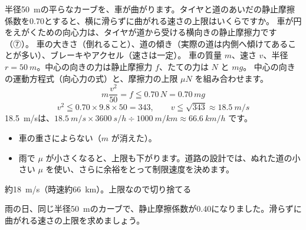\begin{phreidai}[カーブを曲がれる速さ]
\label{ph:力-2:ex8}半径\qty{50}{m}の平らなカーブを、車が曲がります。タイヤと道のあいだの静止摩擦係数を0.70とすると、横に滑らずに曲がれる速さの上限はいくらですか。
\phbamen
車が円をえがくための向心力は、タイヤが道から受ける横向きの静止摩擦力です（⑦）。
\phmushi
車の大きさ（倒れること）、道の傾き（実際の道は内側へ傾けてあることが多い）、ブレーキやアクセル（速さは一定）。
\phzu
車の質量 $m$、速さ $v$、半径 $r=\qty{50}{m}$。中心の向きの力は静止摩擦力 $f$、たての力は $N$ と $mg$。
\phriyu
中心の向きの運動方程式（向心力の式）と、摩擦力の上限 $\mu N$ を組み合わせます。
\phtateru
\[ m\frac{v^2}{50}=f\leqq0.70\,N=0.70\,mg \]
\phtoku
\[ v^2\leqq0.70\times9.8\times50=343,\qquad v\leqq\sqrt{343}\approx\qty{18.5}{m/s} \]
\qty{18.5}{m/s}は、$\qty{18.5}{m/s}\times\qty{3600}{s/h}\div\qty{1000}{m/km}\approx\qty{66.6}{km/h}$ です。
\phtashikame
\begin{itemize}[leftmargin=1.2\zw, itemsep=1pt, topsep=1pt, label={\color{bkTheme}●}]
\item 車の重さによらない（$m$ が消えた）。
\item 雨で $\mu$ が小さくなると、上限も下がります。道路の設計では、ぬれた道の小さい $\mu$ を使い、さらに余裕をとって制限速度を決めます。
\end{itemize}
\kotae 約\qty{18}{m/s}（時速約\qty{66}{km}）。上限なので切り捨てる
\end{phreidai}
\begin{jibun}
雨の日、同じ半径\qty{50}{m}のカーブで、静止摩擦係数が0.40になりました。滑らずに曲がれる速さの上限を求めましょう。
\end{jibun}

